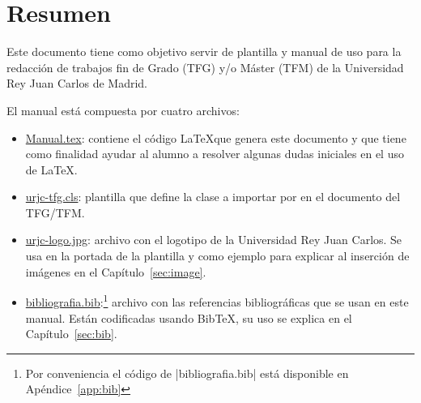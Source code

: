 \documentclass[twoside]{urjc-tfg}
\begin{document}
\maketitle


\cleardoublepage
{}
\setcounter{page}{1}

\chapter*{Resumen}


Este documento tiene como objetivo servir de plantilla y manual de uso
para la redacción de trabajos fin de Grado (TFG) y/o Máster (TFM) de
la Universidad Rey Juan Carlos de Madrid.

El manual está compuesta por cuatro archivos:
\begin{itemize}
\item \url{Manual.tex}: contiene el código \LaTeX que genera este
  documento y que tiene como finalidad ayudar al alumno a resolver
  algunas dudas iniciales en el uso de \LaTeX.

\item \url{urjc-tfg.cls}: plantilla que define la clase a importar por
  en el documento del TFG/TFM.

\item \url{urjc-logo.jpg}: archivo con el logotipo de la
  Universidad Rey Juan Carlos. Se usa en la portada de la plantilla y
  como ejemplo para explicar al inserción de imágenes en el
  Capítulo~\ref{sec:image}.

\item \url{bibliografia.bib}:\footnote{Por conveniencia el código de
    \code|bibliografia.bib| está disponible en Apéndice~\ref{app:bib}}
  archivo con las referencias bibliográficas que se usan en este
  manual. Están codificadas usando BibTeX, su uso se explica en el
  Capítulo~\ref{sec:bib}.
\end{itemize}







{
  \setlength{\parskip}{1pt}

  \cleardoublepage
  \tableofcontents

  \cleardoublepage
  \listoftables

  \cleardoublepage
  \listoffigures
}
\end{document}
